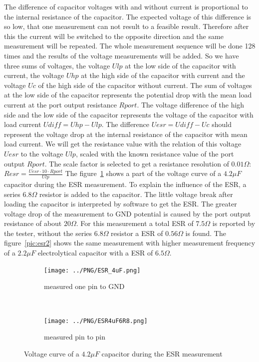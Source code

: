 The difference of capacitor voltages with and without current is proportional to the internal resistance of the capacitor. 
The expected voltage of this difference is so low, that one measurement can not result to a feasible result.
Therefore after this the current will be switched to the opposite direction and the same measurement will be repeated.
The whole measurement sequence will be done 128 times and the results of the voltage measurements will be added.
So we have three sums of voltages, the voltage \(Ulp\) at the low side of the capacitor with current, the voltage \(Uhp\) at
the high side of the capacitor with current and the voltage \(Uc\) of the high side of the capacitor without current.
The sum of voltages at the low side of the capacitor represents the potential drop with the mean load current at
the port output resistance \(Rport\). 
The voltage difference  of the high side and the low side of the capacitor represents the voltage of the capacitor with
load current \(Udiff = Uhp - Ulp\).
The difference \(Uesr = Udiff - Uc\) should represent the voltage drop at the internal resistance of the capacitor with
mean load current.
We will get the resistance value with the relation of this voltage \(Uesr\) to the voltage \(Ulp\), scaled with the
known resistance value of the port output \(Rport\).
The scale factor is selected to get a resistance resolution of \(0.01\Omega\):  \(Resr = \frac{Uesr \cdot 10 \cdot Rport}{Ulp}\)
The figure~\ref{pic:esr4} shows a part of the voltage curve of a \(4.2\mu F\) capacitor during the ESR measurement.
To explain the influence of the ESR, a series \(6.8\Omega\) resistor is added to the capacitor.
The little voltage break after loading the capacitor is interpreted by software to get the ESR.
The greater voltage drop of the measurement to GND potential is caused by the port output resistance of about \(20\Omega\).
For this measurement a total ESR of \(7.5\Omega\) is reported by the tester, without the series \(6.8\Omega\) resistor a ESR of \(0.56\Omega\) is found.
The figure~\ref{pic:esr2} shows the same measurement with higher measurement frequency of a \(2.2\mu F\) electrolytical capacitor
with a ESR of \(6.5\Omega\).


\begin{figure}[H]
  \begin{subfigure}[b]{9cm}
    \centering
    \texttt{[image: ../PNG/ESR\_4uF.png]}
    \caption{measured one pin to GND}
  \end{subfigure}
  ~
  \begin{subfigure}[b]{9cm}
    \centering
    \texttt{[image: ../PNG/ESR4uF6R8.png]}
    \caption{measured pin to pin}
  \end{subfigure}
  \caption{Voltage curve of a \(4.2\mu F\) capacitor during the ESR measurement}
  \label{pic:esr4}
\end{figure}


